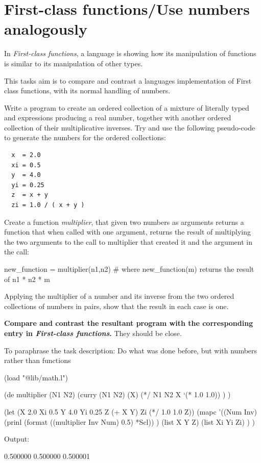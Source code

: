 \pagebreak{}
\section*{First-class functions/Use numbers analogously}

In \emph{First-class functions}, a language is showing how its
manipulation of functions is similar to its manipulation of other
types.

This tasks aim is to compare and contrast a languages implementation of
First class functions, with its normal handling of numbers.

Write a program to create an ordered collection of a mixture of
literally typed and expressions producing a real number, together with
another ordered collection of their multiplicative inverses. Try and
use the following pseudo-code to generate the numbers for the ordered
collections:

\begin{verbatim}
  x  = 2.0
  xi = 0.5
  y  = 4.0
  yi = 0.25
  z  = x + y
  zi = 1.0 / ( x + y )
\end{verbatim}

Create a function \emph{multiplier}, that given two numbers as arguments
returns a function that when called with one argument, returns the
result of multiplying the two arguments to the call to multiplier that
created it and the argument in the call:

\begin{wideverbatim}
 new_function = multiplier(n1,n2)
 # where new_function(m) returns the result of n1 * n2 * m
\end{wideverbatim}

Applying the multiplier of a number and its inverse from the two ordered
collections of numbers in pairs, show that the result in each case is
one.

\textbf{Compare and contrast the resultant program with the
  corresponding entry in \emph{First-class functions}.} They should be
close.

To paraphrase the task description: Do what was done before, but with
numbers rather than functions


\begin{wideverbatim}

(load "@lib/math.l")

(de multiplier (N1 N2)
   (curry (N1 N2) (X)
      (*/ N1 N2 X `(* 1.0 1.0)) ) )

(let (X 2.0  Xi 0.5  Y 4.0  Yi 0.25  Z (+ X Y)  Zi (*/ 1.0 1.0 Z))
   (mapc
      '((Num Inv)
         (prinl (format ((multiplier Inv Num) 0.5) *Scl)) )
      (list X Y Z)
      (list Xi Yi Zi) ) )

Output:

0.500000
0.500000
0.500001

\end{wideverbatim}


